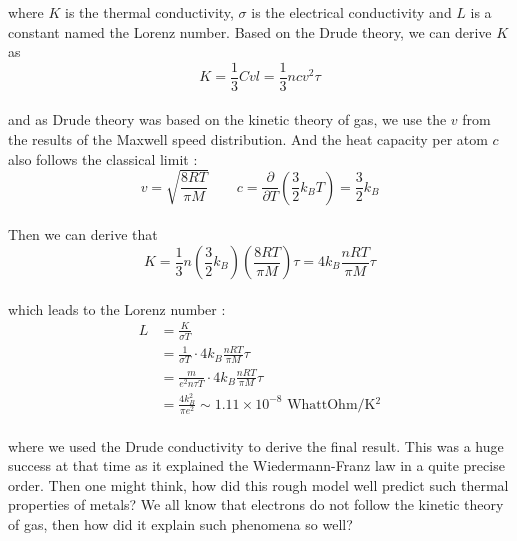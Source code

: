 \documentclass[paper=a4, fontsize=11pt]{scrartcl}
\newcommand{\boltz}{k_B}
\newcommand{\pder}[2]{\frac{\partial #1}{\partial #2}}
\begin{document}
where $K$ is the thermal conductivity, $\sigma$ is the electrical conductivity and $L$ is a constant named the Lorenz number. Based on the Drude theory, we can derive $K$ as \\

\begin{equation}\nonumber
	K = \frac{1}{3} C v l = \frac{1}{3} n c v^2 \tau
\end{equation}\\

and as Drude theory was based on the kinetic theory of gas, we use the $v$ from the results of the Maxwell speed distribution. And the heat capacity per atom $c$ also follows the classical limit :\\

\begin{equation}\nonumber
	v = \sqrt{\frac{8RT}{\pi M}} \qquad c = \pder{}{T} \left( \frac{3}{2} \boltz T \right) = \frac{3}{2} \boltz	 
\end{equation}\\

Then we can derive that \\

\begin{equation}\nonumber
	K = \frac{1}{3} n \left(\frac{3}{2} \boltz\right) \left( \frac{8RT}{\pi M} \right) \tau = 4 \boltz \frac{n R T }{\pi M} \tau
\end{equation}\\

which leads to the Lorenz number : \\

\begin{equation}\nonumber
\begin{split}
	L &= \frac{K}{\sigma T} \\[2.5ex]
	& =   \frac{1}{\sigma T} \cdot 4 \boltz \frac{ nR T }{\pi M} \tau \\[2.5ex]
	&= \frac{m}{e^2 n \tau T}  \cdot 4 \boltz \frac{ nR T }{\pi M} \tau \\[2.5ex]
	&= \frac{4 \boltz^2}{\pi e^2 } \sim 1.11 \times 10^{-8} \text{  WhattOhm/K$^2$}
\end{split}
\end{equation}\\

where we used the Drude conductivity to derive the final result. This was a huge success at that time as it explained the Wiedermann-Franz law in a quite precise order. Then one might think, how did this rough model well predict such thermal properties of metals? We all know that electrons do not follow the kinetic theory of gas, then how did it explain such phenomena so well?\\
\end{document}
